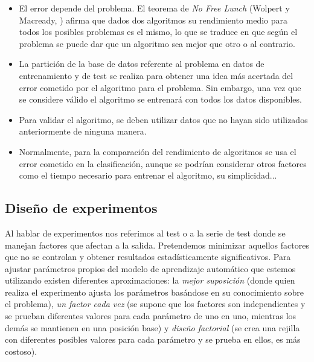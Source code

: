 	\begin{itemize}
	\item El error depende del problema. El teorema de 
		\textit{No Free Lunch} (Wolpert y Macready, 
		\cite{Wolpert:1997:NFL:2221336.2221408}) 
		afirma que dados dos 
		algoritmos su rendimiento medio para todos los 
		posibles problemas es el mismo, lo que se traduce en 
		que según el problema se puede dar que un algoritmo 
		sea mejor que otro o al contrario.
	\item La partición de la base de datos referente al 
		problema en datos de entrenamiento y de test se 
		realiza para obtener una idea más acertada del error 
		cometido por el algoritmo para el problema. Sin 
		embargo, una vez que se considere válido el algoritmo 
		se entrenará con todos los datos disponibles.
	\item Para validar el algoritmo, se deben utilizar datos 
		que no hayan sido utilizados anteriormente de ninguna 
		manera.
	\item Normalmente, para la comparación del rendimiento de 
		algoritmos se usa el error cometido en la 
		clasificación, aunque se podrían considerar otros 
		factores como el tiempo necesario para entrenar el 
		algoritmo, su simplicidad...
	\end{itemize}
	
\subsection*{Diseño de experimentos}

	Al hablar de experimentos nos referimos al test o a la 
serie de test donde se manejan factores que afectan a la 
salida. Pretendemos minimizar aquellos factores que no se 
controlan y obtener resultados estadísticamente 
significativos. Para ajustar parámetros propios del modelo de 
aprendizaje automático que estemos utilizando existen 
diferentes aproximaciones: la \textit{mejor suposición} 
(donde quien realiza el experimento ajusta los parámetros 
basándose en su conocimiento sobre el problema), \textit{un 
factor cada vez} (se supone que los factores son 
independientes y se prueban diferentes valores para cada 
parámetro de uno en uno, mientras los demás se mantienen en 
una posición base) y \textit{diseño factorial} (se crea una 
rejilla con diferentes posibles valores para cada parámetro y 
se prueba en ellos, es más costoso).\\

